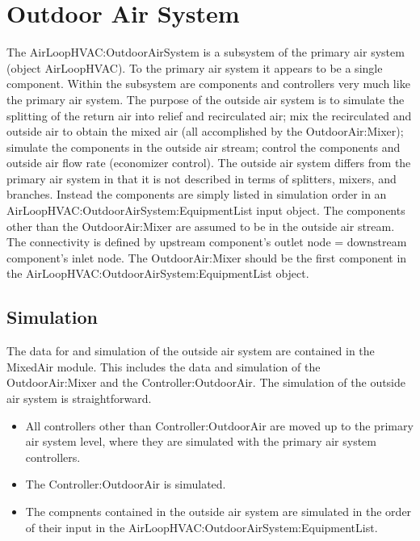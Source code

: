 \section{Outdoor Air System}\label{outdoor-air-system}

The AirLoopHVAC:OutdoorAirSystem is a subsystem of the primary air system (object AirLoopHVAC). To the primary air system it appears to be a single component. Within the subsystem are components and controllers very much like the primary air system. The purpose of the outside air system is to simulate the splitting of the return air into relief and recirculated air; mix the recirculated and outside air to obtain the mixed air (all accomplished by the OutdoorAir:Mixer); simulate the components in the outside air stream; control the components and outside air flow rate (economizer control). The outside air system differs from the primary air system in that it is not described in terms of splitters, mixers, and branches. Instead the components are simply listed in simulation order in an AirLoopHVAC:OutdoorAirSystem:EquipmentList input object. The components other than the OutdoorAir:Mixer are assumed to be in the outside air stream. The connectivity is defined by upstream component's outlet node = downstream component's inlet node. The OutdoorAir:Mixer should be the first component in the AirLoopHVAC:OutdoorAirSystem:EquipmentList object.

\subsection{Simulation}\label{simulation-002}

The data for and simulation of the outside air system are contained in the MixedAir module. This includes the data and simulation of the OutdoorAir:Mixer and the Controller:OutdoorAir. The simulation of the outside air system is straightforward.

\begin{itemize}
\item
  All controllers other than Controller:OutdoorAir are moved up to the primary air system level, where they are simulated with the primary air system controllers.
\item
  The Controller:OutdoorAir is simulated.
\item
  The compnents contained in the outside air system are simulated in the order of their input in the AirLoopHVAC:OutdoorAirSystem:EquipmentList.
\end{itemize}
